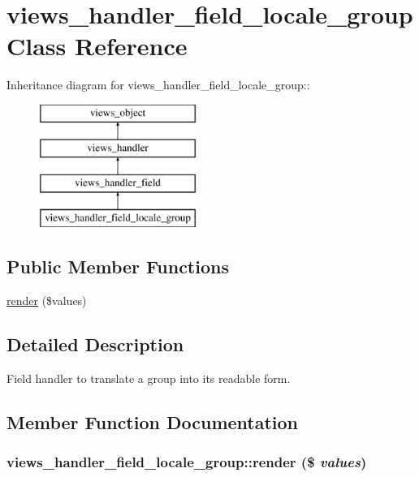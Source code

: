 \hypertarget{classviews__handler__field__locale__group}{
\section{views\_\-handler\_\-field\_\-locale\_\-group Class Reference}
\label{classviews__handler__field__locale__group}
}
Inheritance diagram for views\_\-handler\_\-field\_\-locale\_\-group::\begin{figure}[H]
\begin{center}
\leavevmode
\includegraphics[height=4cm]{classviews__handler__field__locale__group}
\end{center}
\end{figure}
\subsection*{Public Member Functions}
\begin{CompactItemize}
\item 
\hyperlink{classviews__handler__field__locale__group_e1e6ec6ec1b2e071735ca54942bfde9b}{render} (\$values)
\end{CompactItemize}


\subsection{Detailed Description}
Field handler to translate a group into its readable form. 

\subsection{Member Function Documentation}
\hypertarget{classviews__handler__field__locale__group_e1e6ec6ec1b2e071735ca54942bfde9b}{
\subsubsection[{render}]{\setlength{\rightskip}{0pt plus 5cm}views\_\-handler\_\-field\_\-locale\_\-group::render (\$ {\em values})}}
\label{classviews__handler__field__locale__group_e1e6ec6ec1b2e071735ca54942bfde9b}



